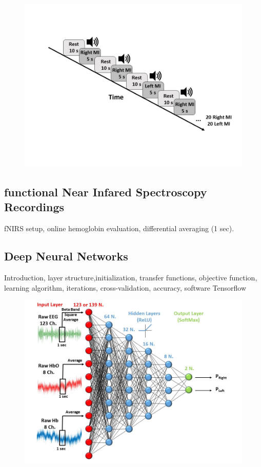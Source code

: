 \documentclass[12pt ]{iopart}
\begin{document}

\begin{figure}
	\includegraphics[width=\linewidth]{Diapositiva2.JPG}
	\caption{}
	\label{fig:fig2}
\end{figure}

\subsection{functional Near Infared Spectroscopy Recordings}
fNIRS setup, online hemoglobin evaluation, differential averaging (1 sec).
\subsection{Deep Neural Networks}
Introduction, layer structure,initialization, transfer functions, objective function, learning algorithm,  iterations, cross-validation,  accuracy, software Tensorflow
\begin{figure}
	\includegraphics[width=\linewidth]{Diapositiva3.JPG}
	\caption{}
	\label{fig:fig3}
\end{figure}
\end{document}
